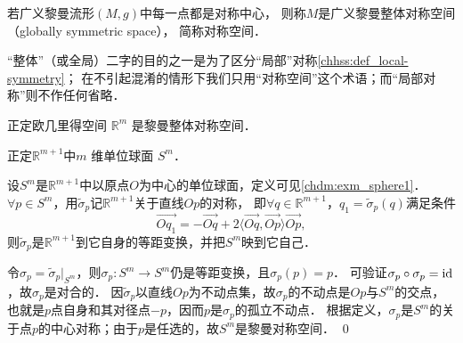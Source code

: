 \begin{definition}\label{chhss:def_global-symmetry}
    若广义黎曼流形$(M,g)$中每一点都是对称中心，
    则称$M$是{\heiti 广义黎曼整体对称空间}（globally symmetric space）， 
    简称{\heiti 对称空间}．
\end{definition}

“整体”（或全局）二字的目的之一是为了区分“局部”对称\ref{chhss:def_local-symmetry}；
在不引起混淆的情形下我们只用“对称空间”这个术语；而“局部对称”则不作任何省略．

\begin{example}
    正定欧几里得空间 $\mathbb{R}^m$ 是黎曼整体对称空间．
\end{example}    
\begin{example}
    正定$\mathbb{R}^{m+1}$中$m$ 维单位球面 $S^m$．
\end{example}    
设$S^m$是$\mathbb{R}^{m+1}$中以原点$O$为中心的单位球面，定义可见\ref{chdm:exm_sphere1}．
$\forall p \in S^m$，用$\tilde{\sigma}_p$记$\mathbb{R}^{m+1}$关于直线$Op$的对称，
即$\forall q \in \mathbb{R}^{m+1}$，$q_1=\tilde{\sigma}_p(q)$满足条件
\begin{equation}
    \overrightarrow{O q_1}=-\overrightarrow{O q}+ 
     2\langle\overrightarrow{O q}, \overrightarrow{O p}\rangle \overrightarrow{O p},
\end{equation}
则$\tilde{\sigma}_p$是$\mathbb{R}^{m+1}$到它自身的等距变换，并把$S^m$映到它自己．

令$\sigma_p=\tilde{\sigma}_p|_{S^m}$，则$\sigma_p:S^m\to S^m$仍是等距变换，且$\sigma_p(p)=p$．
可验证$\sigma_p\circ \sigma_p ={\rm id}$，故$\sigma_p$是对合的．
因$\tilde{\sigma}_p$以直线$Op$为不动点集，故$\sigma_p$的不动点是$Op$与$S^m$的交点，
也就是$p$点自身和其对径点$-p$，因而$p$是$\sigma_p$的孤立不动点．
根据定义，$\sigma_p$是$S^m$的关于点$p$的中心对称；由于$p$是任选的，故$S^m$是黎曼对称空间．
\qed





